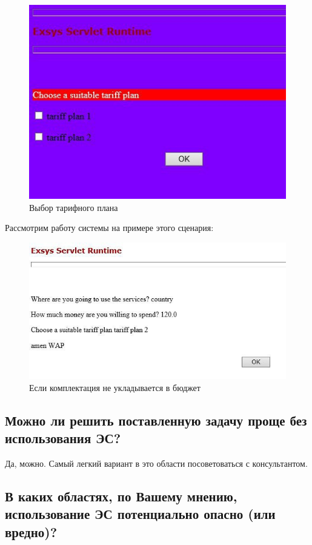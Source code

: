 \documentclass[14pt,a4paper,report]{report}
\begin{document}
\begin{figure}[h!]
	\centering
	\includegraphics[scale = 0.70]{images/5.jpg}
	\caption{Выбор тарифного плана}
\end{figure}

Рассмотрим работу системы на примере этого сценария:

\begin{figure}[h!]
	\centering
	\includegraphics[scale = 0.90]{images/6.jpg}
	\caption{Если комплектация не укладывается в бюджет}
\end{figure}

\clearpage
\subsection{Можно ли решить поставленную задачу проще без использования ЭС?}

Да, можно. Самый легкий вариант в это области посоветоваться с консультантом. 

\subsection{В каких областях, по Вашему мнению, использование ЭС потенциально опасно (или вредно)?}
\end{document}
